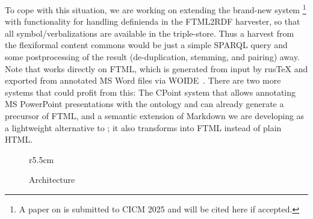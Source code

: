 \documentclass[runningheads]{llncs}
\newcommand\snify{\textsf{snify}\xspace}
\newcommand\FTML{\textsf{FTML}\xspace}
\newcommand\WOIDE{\textsf{WOIDE}\xspace}
\begin{document}
To cope with this situation, we are working on extending the brand-new \flams system
\cite{flams:on}\footnote{A paper on \flams is submitted to CICM 2025 and will be cited
  here if accepted.} with functionality for handling definienda in the FTML2RDF harvester,
so that all symbol/verbalizations are available in the \flams triple-store. Thus a harvest
from the flexiformal content commons would be just a simple SPARQL query and some
postprocessing of the result (de-duplication, stemming, and pairing) away. Note that
\flams works directly on \FTML, which is generated from \sTeX input by \textsf{rus\TeX}
and exported from annotated MS Word files via \WOIDE~\cite{KohKoh:woide24}. There are two
more systems that could profit from this: The CPoint system that allows annotating MS
PowerPoint presentations with the \sTeX ontology and can already generate a precursor of
\FTML \cite{Kohlhase:SemanticInteractionDesignDiss:biblatex}, and a semantic extension of
Markdown we are developing as a lightweight alternative to \sTeX; it also transforms into
FTML instead of plain HTML.

\begin{figure}r{5.5cm}\vspace*{-2em}
  \caption{Architecture}\label{fig:arch}\vspace*{-1em}
\end{figure}
\end{document}
